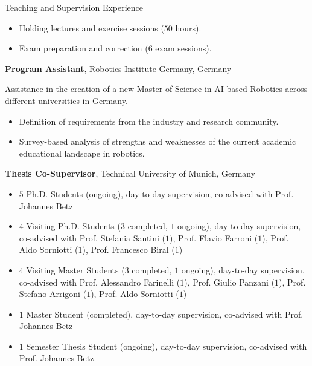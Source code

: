 \begin{rubric}{Teaching and Supervision Experience}
\begin{itemize}
        \item Holding lectures and exercise sessions ($50$ hours).\vspace{-0.35cm}
        \item Exam preparation and correction ($6$ exam sessions).
    \end{itemize}
%
\entry*[03/2025 -- 03/2026]%
	\textbf{Program Assistant}, Robotics Institute Germany, Germany
    \par Assistance in the creation of a new Master of Science in AI-based Robotics across different universities in Germany.
    \vspace{-0.3cm}
    \begin{itemize}
        \item Definition of requirements from the industry and research community.\vspace{-0.32cm}
        \item Survey-based analysis of strengths and weaknesses of the current academic educational landscape in robotics.
    \end{itemize}
%
\entry*[2025 -- present]%
	\textbf{Thesis Co-Supervisor}, Technical University of Munich, Germany
    \vspace{-0.3cm}
    \begin{itemize}
        \item $5$ Ph.D. Students (ongoing), day-to-day supervision, co-advised with Prof. Johannes Betz \vspace{-0.35cm}
        \item $4$ Visiting Ph.D. Students ($3$ completed, $1$ ongoing), day-to-day supervision, co-advised with Prof. Stefania Santini ($1$), Prof. Flavio Farroni ($1$), Prof. Aldo Sorniotti ($1$), Prof. Francesco Biral ($1$) \vspace{-0.35cm}
        \item $4$ Visiting Master Students ($3$ completed, $1$ ongoing), day-to-day supervision, co-advised with Prof. Alessandro Farinelli ($1$), Prof. Giulio Panzani ($1$), Prof. Stefano Arrigoni ($1$), Prof. Aldo Sorniotti ($1$) \vspace{-0.35cm}
        \item $1$ Master Student (completed), day-to-day supervision, co-advised with Prof. Johannes Betz \vspace{-0.35cm}
        \item $1$ Semester Thesis Student (ongoing), day-to-day supervision, co-advised with Prof. Johannes Betz
    \end{itemize}
%
\entry*[2025 -- present]%

\end{rubric}
